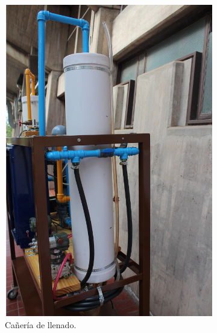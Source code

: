 \begin{figure}[ht]
        \centering
        \begin{subfigure}[b]{0.36\textwidth}
\includegraphics[width=\textwidth]
	{Cap2-DisenoEnsamblado/images/caneria1.JPG}
	\caption{Cañería de llenado.}
        \end{subfigure}%
        \hfil
        \begin{subfigure}[b]{0.36\textwidth}

\end{subfigure}
\end{figure}
